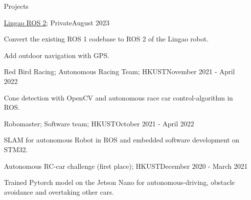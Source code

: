 \documentclass[
	a4paper, %
	11pt, %
]{resume} %
\begin{document}
\begin{rSection}{Projects}

	\begin{rSubsection}{\href{https://github.com/JosefGst/lingao_ros2}{Lingao ROS 2}; Private}{August 2023}{}{}
		\item Convert the existing ROS 1 codebase to ROS 2 of the Lingao robot.
		\item Add outdoor navigation with GPS.
	\end{rSubsection}


	\begin{rSubsection}{Red Bird Racing; Autonomous Racing Team; HKUST}{November 2021 - April 2022}{}{}
		\item Cone detection with OpenCV and autonomous race car control-algorithm in ROS.
	\end{rSubsection}


	\begin{rSubsection}{Robomaster; Software team; HKUST}{October 2021 - April 2022}{}{}
		\item SLAM for autonomous Robot in ROS and embedded software development on STM32.
	\end{rSubsection}


	\begin{rSubsection}{Autonomous RC-car challenge (first place); HKUST}{December 2020 - March 2021}{}{}
		\item Trained Pytorch model on the Jetson Nano for autonomous-driving, obstacle avoidance and overtaking other cars.
	\end{rSubsection}

\end{rSection}






\end{document}
